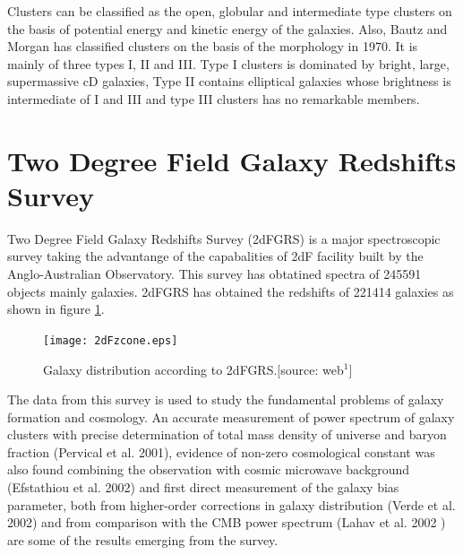 Clusters can be classified as the open, globular and intermediate type clusters on the basis of potential energy and kinetic energy of the galaxies. Also, Bautz and Morgan has classified clusters on the basis of the morphology in 1970. It is mainly of three types I, II and III. Type I clusters is dominated by bright, large, supermassive cD galaxies, Type II contains elliptical galaxies whose brightness is intermediate of I and III and type III clusters has no remarkable members. 
\section{Two Degree Field Galaxy Redshifts Survey}
Two Degree Field Galaxy Redshifts Survey (2dFGRS) is a major spectroscopic survey taking the advantange of the capabalities of 2dF facility built by the Anglo-Australian Observatory. This survey has obtatined spectra of 245591 objects mainly galaxies. 2dFGRS has obtained the redshifts of 221414 galaxies as shown in figure \ref{2df}.
\begin{figure}[H]
\begin{center}
 \texttt{[image: 2dFzcone.eps]}
        \caption{Galaxy distribution according to 2dFGRS.[source: web$^1$]}\label{2df}
 \end{center}  
\end{figure}
\noindent The data from this survey is used to study the fundamental problems of galaxy formation and cosmology. An accurate measurement of power spectrum of galaxy clusters with precise determination of total mass density of universe and baryon fraction (Pervical et al. 2001), evidence of non-zero cosmological constant was also found combining the observation with cosmic microwave background (Efstathiou et al. 2002) and first direct measurement of the galaxy bias parameter, both from higher-order corrections in galaxy distribution (Verde et al. 2002) and from comparison with the CMB power spectrum (Lahav et al. 2002 ) are some of the results emerging from the survey.
\\

